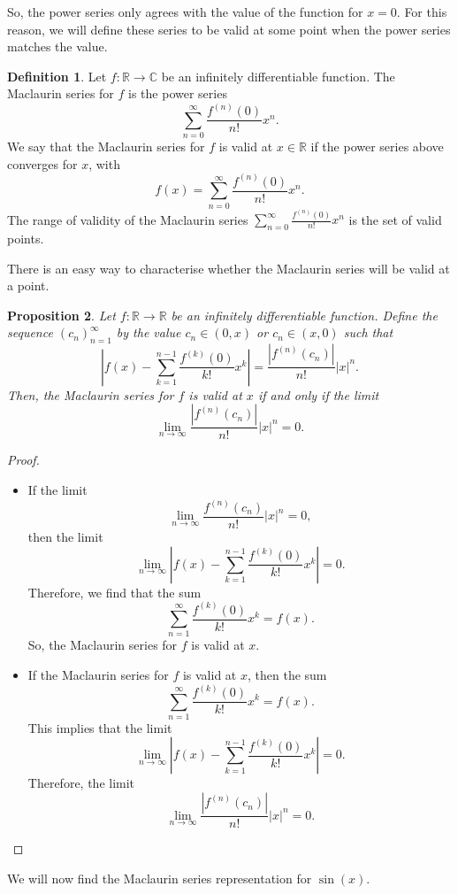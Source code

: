 \documentclass[a4paper, openany]{memoir}
\theoremstyle{definition}
\newtheorem{definition}{Definition}[section]
\theoremstyle{plain}
\newtheorem{proposition}[definition]{Proposition}
\begin{document}
\noindent So, the power series only agrees with the value of the function for $x = 0$. For this reason, we will define these series to be valid at some point when the power series matches the value.
\begin{definition}
Let $f: \mathbb{R} \to \mathbb{C}$ be an infinitely differentiable function. The Maclaurin series for $f$ is the power series
\[\sum_{n=0}^{\infty} \frac{f^{(n)}(0)}{n!} x^n.\]
We say that the Maclaurin series for $f$ is valid at $x \in \mathbb{R}$ if the power series above converges for $x$, with
\[f(x) = \sum_{n=0}^{\infty} \frac{f^{(n)}(0)}{n!} x^n.\]
The range of validity of the Maclaurin series $\sum_{n=0}^{\infty} \frac{f^{(n)}(0)}{n!} x^n$ is the set of valid points.
\end{definition}
\noindent There is an easy way to characterise whether the Maclaurin series will be valid at a point.
\begin{proposition}
Let $f: \mathbb{R} \to \mathbb{R}$ be an infinitely differentiable function. Define the sequence $(c_n)_{n=1}^{\infty}$ by the value $c_n \in (0, x)$ or $c_n \in (x, 0)$ such that
\[\left|f(x) - \sum_{k=1}^{n-1} \frac{f^{(k)}(0)}{k!} x^k\right| = \frac{|f^{(n)}(c_n)|}{n!} |x|^n.\]
Then, the Maclaurin series for $f$ is valid at $x$ if and only if the limit
\[\lim_{n \to \infty} \frac{|f^{(n)}(c_n)|}{n!} |x|^n = 0.\]
\end{proposition}
\begin{proof}
\hspace*{0pt}
\begin{itemize}
    \item If the limit 
    \[\lim_{n \to \infty} \frac{f^{(n)}(c_n)}{n!} |x|^n = 0,\]
    then the limit
    \[\lim_{n \to \infty} \left|f(x) - \sum_{k=1}^{n-1} \frac{f^{(k)} (0)}{k!} x^k\right| = 0.\]
    Therefore, we find that the sum
    \[\sum_{n=1}^{\infty} \frac{f^{(k)} (0)}{k!} x^k = f(x).\]
    So, the Maclaurin series for $f$ is valid at $x$.
    
    \item If the Maclaurin series for $f$ is valid at $x$, then the sum
    \[\sum_{n=1}^{\infty} \frac{f^{(k)} (0)}{k!} x^k = f(x).\]
    This implies that the limit
    \[\lim_{n \to \infty} \left|f(x) - \sum_{k=1}^{n-1} \frac{f^{(k)} (0)}{k!} x^k\right| = 0.\]
    Therefore, the limit 
    \[\lim_{n \to \infty} \frac{|f^{(n)}(c_n)|}{n!} |x|^n = 0.\]
\end{itemize}
\end{proof}
\noindent We will now find the Maclaurin series representation for $\sin (x)$.
\end{document}
